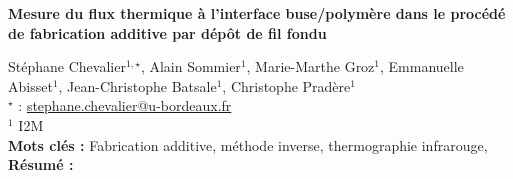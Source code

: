 


    \newpage

\BgThispage

%
\begin{flushleft}
\addtocounter{section}{1}
{\Large \textbf{Mesure du flux thermique à l'interface buse/polymère dans le procédé de fabrication additive par dépôt de fil fondu}}\label{ref:62}
\end{flushleft}
%
Stéphane Chevalier$^{1,\star}$, Alain Sommier$^{1}$, Marie-Marthe Groz$^{1}$, Emmanuelle Abisset$^{1}$, Jean-Christophe Batsale$^{1}$, Christophe Pradère$^{1}$\\[2mm]
$^{\star}$ \Letter : \url{stephane.chevalier@u-bordeaux.fr}\\[2mm]
{\footnotesize $^{1}$ I2M}\\
[4mm]
%
\noindent \textbf{Mots clés : } Fabrication additive, méthode inverse, thermographie infrarouge,\\[4mm]
%
\noindent \textbf{Résumé : } 

